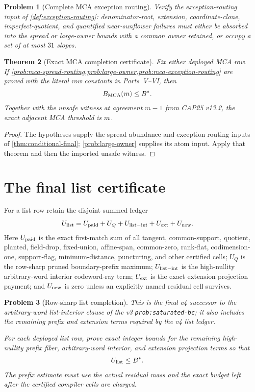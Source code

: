 \documentclass[11pt,a4paper]{amsart}
\numberwithin{equation}{section}
\newtheorem{theorem}{Theorem}[section]
\newtheorem{problem}[theorem]{Problem}
\theoremstyle{remark}
\begin{document}
\begin{problem}[Complete MCA exception routing]\label{prob:mca-exception-routing}
Verify the exception-routing input of \cref{def:exception-routing}: denominator-root, extension, coordinate-clone, imperfect-quotient, and quantified near-sunflower failures must either be absorbed into the spread or large-owner bounds with a common owner retained, or occupy a set of at most $31$ slopes.
\end{problem}

\begin{theorem}[Exact MCA completion certificate]\label{thm:mca-completion-certificate}
Fix either deployed MCA row.  If \cref{prob:mca-spread-routing,prob:large-owner,prob:mca-exception-routing} are proved with the literal row constants in Parts~V--VI, then
\[
 B_{\rm MCA}(m)\le B^*.
\]
Together with the unsafe witness at agreement $m-1$ from CAP25 v13.2, the exact adjacent MCA threshold is $m$.
\end{theorem}

\begin{proof}
The hypotheses supply the spread-abundance and exception-routing inputs of \cref{thm:conditional-final}; \cref{prob:large-owner} supplies its atom input.  Apply that theorem and then the imported unsafe witness.
\end{proof}

\section{The final list certificate}
\label{sec:list-final-certificate}
For a list row retain the disjoint summed ledger
\begin{equation}
 U_{\rm list}
 =U_{\rm paid}+U_Q+U_{\rm list-int}+U_{\rm ext}+U_{\rm new}.
 \label{eq:list-final-ledger}
\end{equation}
Here $U_{\rm paid}$ is the exact first-match sum of all tangent, common-support, quotient, planted, field-drop, fixed-union, affine-span, common-zero, rank-flat, codimension-one, support-flag, minimum-distance, puncturing, and other certified cells; $U_Q$ is the row-sharp pruned boundary-prefix maximum; $U_{\rm list-int}$ is the high-nullity arbitrary-word interior codeword-ray term; $U_{\rm ext}$ is the exact extension projection payment; and $U_{\rm new}$ is zero unless an explicitly named residual cell survives.

\begin{problem}[Row-sharp list completion]\label{prob:list-completion}
This is the final v4 successor to the arbitrary-word list-interior clause of
the v3 \texttt{prob:saturated-bc}; it also includes the remaining prefix and
extension terms required by the v4 list ledger.

For each deployed list row, prove exact integer bounds for the remaining high-nullity prefix fiber, arbitrary-word interior, and extension projection terms so that
\[
 U_{\rm list}\le B^*.
\]
The prefix estimate must use the actual residual mass and the exact budget left after the certified compiler cells are charged.
\end{problem}
\end{document}
